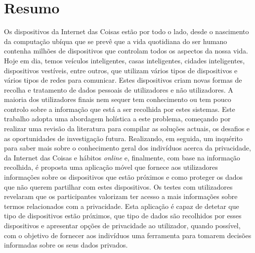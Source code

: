 %
%
\chapter*{Resumo}
\justify

Os dispositivos da Internet das Coisas estão por todo o lado, desde
o nascimento da computação ubíqua que se prevê que a vida quotidiana
do ser humano contenha milhões de dispositivos que controlam todos os
aspectos da nossa vida. Hoje em dia, temos veículos inteligentes, casas
inteligentes, cidades inteligentes, dispositivos vestíveis, entre
outros, que utilizam vários tipos de dispositivos e vários tipos de
redes para comunicar. Estes dispositivos criam novas formas de recolha
e tratamento de dados pessoais de utilizadores e não utilizadores.
A maioria dos utilizadores finais nem sequer tem conhecimento ou tem
pouco controlo sobre a informação que está a ser recolhida por
estes sistemas. Este trabalho adopta uma abordagem holística a este
problema, começando por realizar uma revisão da literatura para
compilar as soluções actuais, os desafios e as oportunidades de
investigação futura. Realizando, em seguida, um inquérito para saber mais
sobre o conhecimento geral dos indivíduos acerca da privacidade, da Internet das Coisas e
hábitos \textit{online} e, finalmente, com base na informação recolhida,
é proposta uma aplicação móvel que fornece aos utilizadores informações
sobre os dispositivos que estão próximos e como proteger os dados
que não querem partilhar com estes dispositivos.
Os testes com utilizadores revelaram que os participantes valorizam
ter acesso a mais informações sobre termos relacionados com a privacidade.
Esta aplicação é capaz de detetar que tipo de dispositivos estão próximos,
que tipo de dados são recolhidos por esses dispositivos
e apresentar opções de privacidade ao utilizador, quando possível,
com o objetivo de fornecer aos indivíduos uma ferramenta para tomarem
decisões informadas sobre os seus dados privados.

